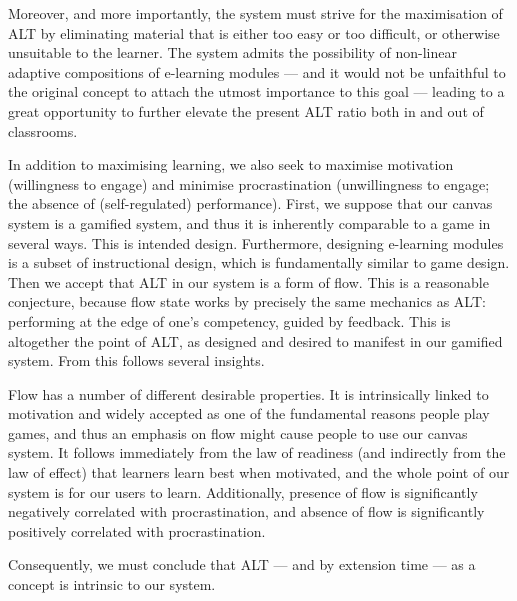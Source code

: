 Moreover, and more importantly, the system must strive for the maximisation of 
ALT by eliminating material that is either too easy or too difficult, or 
otherwise unsuitable to the learner. The system admits the possibility of 
non-linear adaptive compositions of e-learning modules --- and it would not be 
unfaithful to the original concept to attach the utmost importance to this 
goal --- leading to a great opportunity to further elevate the present ALT 
ratio both in and out of classrooms.

In addition to maximising learning, we also seek to maximise motivation 
(willingness to engage) and minimise procrastination (unwillingness to engage; 
the absence of (self-regulated) performance\cite{lee2005relationship}). First, 
we suppose that our canvas system is a gamified system, and thus it is 
inherently comparable to a game in several ways\cite{deterding2011game}. This 
is intended design\cite{berntsen2015enabling}. Furthermore, designing 
e-learning modules is a subset of instructional design, which is fundamentally 
similar to game design\cite{murphy2011games}. Then we accept that ALT in our 
system is a form of flow. This is a reasonable conjecture, because flow state 
works by precisely the same mechanics as ALT: performing at the edge of one's 
competency, guided by feedback\cite{rutledgepositive}. This is altogether the 
point of ALT, as designed and desired to manifest in our gamified system. From 
this follows several insights.

Flow has a number of different desirable properties. It is intrinsically 
linked to motivation and widely accepted as one of the fundamental reasons 
people play games\cite{murphy2011games}, and thus an emphasis on flow might 
cause people to use our canvas system. It follows immediately from the law of 
readiness (and indirectly from the law of effect) that learners learn best 
when motivated\cite{murphy2011games}, and the whole point of our system is for 
our users to learn. Additionally, presence of flow is significantly negatively 
correlated with procrastination, and absence of flow is significantly 
positively correlated with procrastination\cite{lee2005relationship}.

Consequently, we must conclude that ALT --- and by extension time --- as a 
concept is intrinsic to our system.
